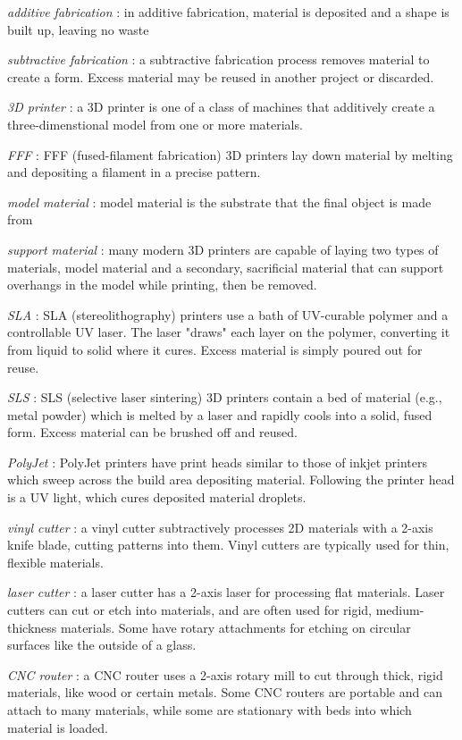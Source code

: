 \emph{additive fabrication} : in additive fabrication, material is deposited and a shape is built up, leaving no waste

\emph{subtractive fabrication} : a subtractive fabrication process removes material to create a form. Excess material may be reused in another project or discarded.

\emph{3D printer} : a 3D printer is one of a class of machines that additively create a three-dimenstional model from one or more materials.

\emph{FFF} : FFF (fused-filament fabrication) 3D printers lay down material by melting and depositing a filament in a precise pattern.

\emph{model material} : model material is the substrate that the final object is made from

\emph{support material} : many modern 3D printers are capable of laying two types of materials, model material and a secondary, sacrificial material that can support overhangs in the model while printing, then be removed.

\emph{SLA} : SLA (stereolithography) printers use a bath of UV-curable polymer and a controllable UV laser. The laser "draws" each layer on the polymer, converting it from liquid to solid where it cures. Excess material is simply poured out for reuse.

\emph{SLS} : SLS (selective laser sintering) 3D printers contain a bed of material (e.g., metal powder) which is melted by a laser and rapidly cools into a solid, fused form. Excess material can be brushed off and reused.

\emph{PolyJet} : PolyJet printers have print heads similar to those of inkjet printers which sweep across the build area depositing material. Following the printer head is a UV light, which cures deposited material droplets.

\emph{vinyl cutter} : a vinyl cutter subtractively processes 2D materials with a 2-axis knife blade, cutting patterns into them. Vinyl cutters are typically used for thin, flexible materials.

\emph{laser cutter} : a laser cutter has a 2-axis laser for processing flat materials. Laser cutters can cut or etch into materials, and are often used for rigid, medium-thickness materials. Some have rotary attachments for etching on circular surfaces like the outside of a glass.

\emph{CNC router} : a CNC router uses a 2-axis rotary mill to cut through thick, rigid materials, like wood or certain metals. Some CNC routers are portable and can attach to many materials, while some are stationary with beds into which material is loaded.

